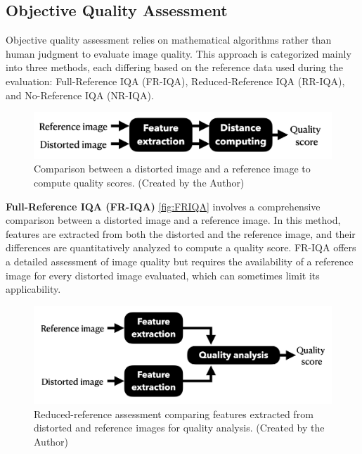 \subsection{Objective Quality Assessment}
\label{sub:ObjectiveQualityAssessment}
Objective quality assessment relies on mathematical algorithms rather than human judgment to evaluate image quality. This approach is categorized mainly into three methods, each differing based on the reference data used during the evaluation: Full-Reference IQA (FR-IQA), Reduced-Reference IQA (RR-IQA), and No-Reference IQA (NR-IQA). \par
\vspace{\baselineskip}
\begin{figure}[ht]
    \centering
    \includegraphics[keepaspectratio,width=15cm]{img/FRIQA.png}
    \caption{Comparison between a distorted image and a reference image to compute quality scores. (Created by the Author)}
    \label{fig:FRIQA}
\end{figure}
\textbf{Full-Reference IQA (FR-IQA)} \autoref{fig:FRIQA}  involves a comprehensive comparison between a distorted image and a reference image. In this method, features are extracted from both the distorted and the reference image, and their differences are quantitatively analyzed to compute a quality score. FR-IQA offers a detailed assessment of image quality but requires the availability of a reference image for every distorted image evaluated, which can sometimes limit its applicability. \par
\vspace{\baselineskip}
\begin{figure}[ht]
    \centering
    \includegraphics[keepaspectratio,width=15cm]{img/RRIQA.png}
    \caption{Reduced-reference assessment comparing features extracted from distorted and reference images for quality analysis. (Created by the Author)}
    \label{fig:RRIQA}
\end{figure}
